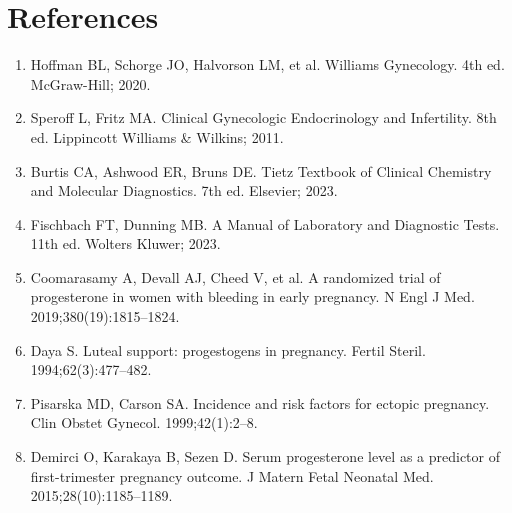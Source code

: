 \section*{References}
\begin{enumerate}
  \item Hoffman BL, Schorge JO, Halvorson LM, et al. Williams Gynecology. 4th ed. McGraw-Hill; 2020.
  \item Speroff L, Fritz MA. Clinical Gynecologic Endocrinology and Infertility. 8th ed. Lippincott Williams \& Wilkins; 2011.
  \item Burtis CA, Ashwood ER, Bruns DE. Tietz Textbook of Clinical Chemistry and Molecular Diagnostics. 7th ed. Elsevier; 2023.
  \item Fischbach FT, Dunning MB. A Manual of Laboratory and Diagnostic Tests. 11th ed. Wolters Kluwer; 2023.
  \item Coomarasamy A, Devall AJ, Cheed V, et al. A randomized trial of progesterone in women with bleeding in early pregnancy. N Engl J Med. 2019;380(19):1815--1824.
  \item Daya S. Luteal support: progestogens in pregnancy. Fertil Steril. 1994;62(3):477--482.
  \item Pisarska MD, Carson SA. Incidence and risk factors for ectopic pregnancy. Clin Obstet Gynecol. 1999;42(1):2--8.
  \item Demirci O, Karakaya B, Sezen D. Serum progesterone level as a predictor of first-trimester pregnancy outcome. J Matern Fetal Neonatal Med. 2015;28(10):1185--1189.
\end{enumerate}

\clearpage
